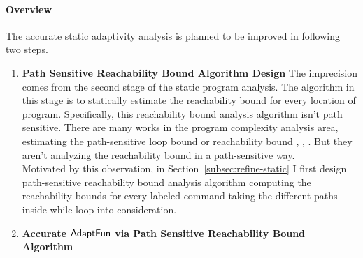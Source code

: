 \paragraph*{Overview}
The accurate static adaptivity analysis is planned to be improved in following two steps.
\begin{enumerate}
    \item \textbf{Path Sensitive Reachability Bound Algorithm Design}
    The imprecision comes from the second stage of the static program analysis.
    The algorithm in this stage is to statically estimate the 
    reachability bound for every location of program.
    Specifically, this reachability bound analysis algorithm isn't path sensitive. 
    There are many works in the program complexity analysis area, estimating the path-sensitive loop bound 
    or reachability bound
    \cite{GustafssonEL05, HumenbergerJK18}, 
    \cite{BrockschmidtEFFG16,AlbertAGP08,AliasDFG10,Flores-MontoyaH14}, 
    \cite{GulwaniZ10, SinnZV17,GulwaniJK09, GulwaniMC09, abs-2203-04243}. 
    But they aren't analyzing the reachability
    bound in a path-sensitive way.
    \\
    Motivated by this observation, 
    in Section~\ref{subsec:refine-static} 
    I first design path-sensitive reachability bound analysis algorithm computing the 
    reachability bounds for every labeled command taking the different paths inside while loop into consideration.
    \item \textbf{Accurate $\textsf{AdaptFun}$ via Path Sensitive Reachability Bound Algorithm}


\end{enumerate}

